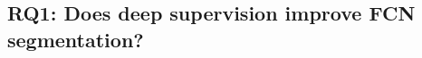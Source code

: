 \documentclass[runningheads]{llncs}
\begin{document}
    
    
    
    
    
    
    
    

    \subsection{RQ1: Does deep supervision improve FCN segmentation?}
    
    
    
    
\end{document}
